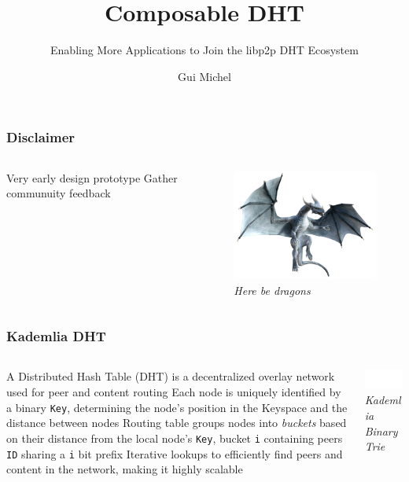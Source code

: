 \documentclass{../pl-slide}
\title{Composable DHT}
\subtitle{Enabling More Applications to Join the libp2p DHT Ecosystem}
\author{Gui Michel}
\institute{Protocol Labs}
\date{\DTMdate{2023-04-15}}
\begin{document}
\frame{\titlepage}

\begin{frame}
\frametitle{Disclaimer}

\begin{columns}[onlytextwidth]
	\begin{column}{0.59\textwidth}
		\begin{itemize}
			\itemc Very early design prototype
			\itemc Gather communuity feedback
		\end{itemize}
	\end{column}
		\begin{column}{0.39\textwidth}
    		\begin{center}
        		\includegraphics[width=13em]{resources/dragon.png}
        		\textit{Here be dragons}
    		\end{center}
	\end{column}

\end{columns}
\end{frame}


\begin{frame}
\frametitle{Kademlia DHT}

\begin{columns}[onlytextwidth]
	\begin{column}{0.64\textwidth}
		\begin{itemize}
			\itemc A Distributed Hash Table (DHT) is a decentralized overlay network used for peer and content routing
			\itemc Each node is uniquely identified by a binary \texttt{Key}, determining the node's position in the Keyspace and the distance between nodes
			\itemc Routing table groups nodes into \textit{buckets} based on their distance from the local node's \texttt{Key}, bucket \texttt{i} containing peers \texttt{ID} sharing a \texttt{i} bit prefix
			\itemc Iterative lookups to efficiently find peers and content in the network, making it highly scalable
		\end{itemize}
	\end{column}
		\begin{column}{0.34\textwidth}
    		\begin{center}
        		\includegraphics[width=13em]{resources/kademlia-trie.png}
        		\textit{Kademlia Binary Trie}
    		\end{center}
	\end{column}

\end{columns}
\end{frame}
\end{document}
